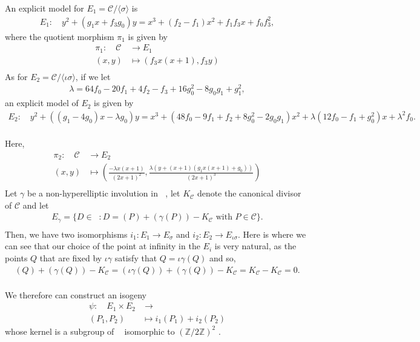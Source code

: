 \documentclass{amsart}
\newcommand{\calC}{\mathcal{C}}
\DeclareMathOperator{\Jac}{Jac}
\DeclareMathOperator{\Jacc}{\Jac(\mathcal{C})}
\numberwithin{equation}{section}
\theoremstyle{definition}
\theoremstyle{remark}
\begin{document}
An explicit model for $E_1=\calC/\langle \sigma\rangle$ is
\begin{align*}
E_1\colon\quad y^2+(g_1 x+f_3g_0)y=x^3+(f_2-f_1)x^2+f_1f_3x+f_0f_3^2,
\end{align*}
where the quotient morphism $\pi_1$ is given by 
\begin{align*}
\pi_1\colon\quad\calC&\longrightarrow E_1\\
(x,y)&\longmapsto (f_3x(x+1),f_3y)\\
\end{align*}
As for $E_2=\calC/\langle \iota\sigma\rangle$, if we let
\begin{align*}
\lambda=64f_0 - 20f_1 + 4f_2 - f_3 + 16g_0^2 - 8g_0g_1 + g_1^2,
\end{align*}
an explicit model of $E_2$ is given by
\begin{align*}
E_2\colon\quad y^2+((g_1-4g_0 )x-\lambda g_0)y=x^3+( 48f_0 - 9f_1 + f_2 + 8g_0^2 - 2g_0g_1)x^2+\lambda (12f_0 - f_1 + g_0^2)x+\lambda^2 f_0.\\
\end{align*}

Here,
\begin{align*}
\pi_2\colon\quad\calC&\longrightarrow E_2\\
(x,y)&\longmapsto \left(\frac{-\lambda x(x+1)}{(2x+1)^2}, \frac{\lambda(y+(x+1)(g_1 x(x+1)+g_0))}{(2x+1)^3}\right)\\
\end{align*}
Let $\gamma$ be a non-hyperelliptic involution in $\Jacc$, let $K_\calC$ denote the canonical divisor of $\calC$ and let
\begin{align*}
E_\gamma=\{D\in\Jacc:  D=(P)+(\gamma(P))-K_\calC\text{ with } P\in\calC\}.\\
\end{align*} 
Then, we have two isomorphisms $i_1:E_1\rightarrow E_\sigma $ and $i_2:E_2\rightarrow E_{\iota\sigma}$. Here is where we can see that our choice of the point at infinity in the $E_i$ is very natural, as the points $Q$ that are fixed by $\iota\gamma$ satisfy that $Q=\iota\gamma(Q)$ and so,
\begin{align*}
(Q)+(\gamma(Q))-K_\calC=(\iota\gamma(Q))+(\gamma(Q))-K_\calC=K_\calC-K_\calC=0.\\
\end{align*}

We therefore can construct an isogeny
\begin{align*}
\psi\colon\quad E_1\times E_2 &\longrightarrow \Jacc \\
(P_1,P_2)&\longmapsto i_1(P_1)+i_2(P_2)
\end{align*}
whose kernel is a subgroup of $\Jacc$ isomorphic to $(\mathbb{Z}/2\mathbb{Z})^2$ \cite{Artebani2014OnSurface}.\\
\end{document}
